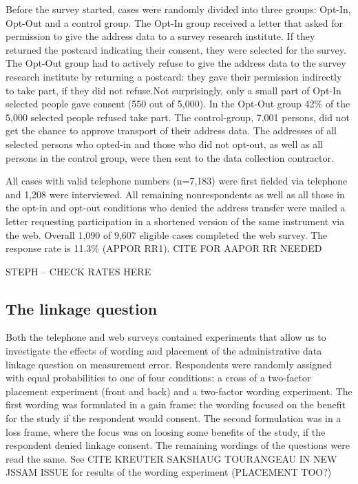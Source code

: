 Before the survey started, cases were randomly divided into three groups: Opt-In, Opt-Out and a control group. The Opt-In group received a letter that asked for permission to give the address data to a survey research institute. If they returned the postcard indicating their consent, they were selected for the survey. The Opt-Out group had to actively refuse to give the address data to the survey research institute by returning a postcard: they gave their permission indirectly to take part, if they did not refuse.Not surprisingly, only a small part of Opt-In selected people gave consent (550 out of 5,000). In the Opt-Out group 42\% of the 5,000 selected people refused take part. The control-group, 7,001 persons, did not get the chance to approve transport of their address data. The addresses of all selected persons who opted-in and those who did not opt-out, as well as all persons in the control group, were then sent to the data collection contractor.

All cases with valid telephone numbers (n=7,183) were first fielded via telephone and 1,208 were interviewed. All remaining nonrespondents as well as all those in the opt-in and opt-out conditions who denied the address transfer were mailed a letter requesting participation in a shortened version of the same instrument via the web. Overall 1,090 of 9,607 eligible cases completed the web survey. The response rate is 11.3\% (APPOR RR1). CITE FOR AAPOR RR NEEDED

STEPH -- CHECK RATES HERE


\subsection{The linkage question}

Both the telephone and web surveys contained experiments that allow us to  investigate the effects of wording and placement of the administrative data linkage question on measurement error. Respondents were randomly assigned with equal probabilities to one of four conditions: a cross of a two-factor placement experiment (front and back) and a two-factor wording experiment. The first wording was formulated in a gain frame: the wording focused on the benefit for the study if the respondent would consent. The second formulation was in a loss frame, where the focus was on loosing some benefits of the study, if the respondent denied linkage consent. The remaining wordings of the questions were read the same. See CITE KREUTER SAKSHAUG TOURANGEAU IN NEW JSSAM ISSUE for results of the wording experiment (PLACEMENT TOO?)

